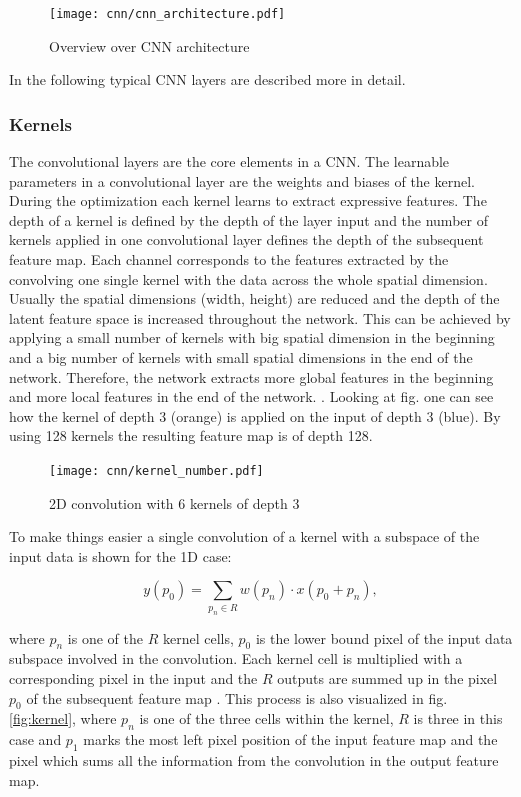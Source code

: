 \begin{figure}[H]
  \centering
  \texttt{[image: cnn/cnn\_architecture.pdf]}
  \caption {Overview over CNN architecture \cite{OShea2015}}
  \label{fig:CNN_overview}
\end{figure}

In the following typical CNN layers are described more in detail. 


\subsubsection{Kernels}
The convolutional layers are the core elements in a CNN. The learnable parameters in a convolutional layer are the weights and biases of the kernel. During the optimization each kernel learns to extract expressive features. The depth of a kernel is defined by the depth of the layer input and the number of kernels applied in one convolutional layer defines the depth of the subsequent feature map. Each channel corresponds to the features extracted by the convolving one single kernel with the data across the whole spatial dimension. Usually the spatial dimensions (width, height) are reduced and the depth of the latent feature space is increased throughout the network. This can be achieved by applying a small number of kernels with big spatial dimension in the beginning and a big number of kernels with small spatial dimensions in the end of the network. Therefore, the network extracts more global features in the beginning and more local features in the end of the network.  \cite{OShea2015}. Looking at fig. \label{fig:kernel_number} one can see how the kernel of depth 3 (orange) is applied on the input of depth 3 (blue). By using 128 kernels the resulting feature map is of depth 128.

\begin{figure}[H]
  \centering
  \texttt{[image: cnn/kernel\_number.pdf]}
  \caption {2D convolution with 6 kernels of depth 3 \cite{Ganesh2019}}
  \label{fig:kernel_number}
\end{figure}


To make things easier a single convolution of a kernel with a subspace of the input data is shown for the 1D case:

\begin{equation}
  y(p_{0}) = \sum_{p_{n} \in R} w(p_{n}) \cdot x(p_{0} + p_{n}), 
  \label{eq:kernel}
\end{equation}

where $p_{n}$ is one of the $R$ kernel cells, $p_{0}$ is the lower bound pixel of the input data subspace involved in the convolution. Each kernel cell is multiplied with a corresponding pixel in the input and the $R$ outputs are summed up in the pixel $p_{0}$ of the subsequent feature map \cite{Ganesh2019}. This process is also visualized in fig. \ref{fig:kernel}, where $p_{n}$ is one of the three cells within the kernel, $R$ is three in this case and $p_{1}$ marks the most left pixel position of the input feature map and the pixel which sums all the information from the convolution in the output feature map.


